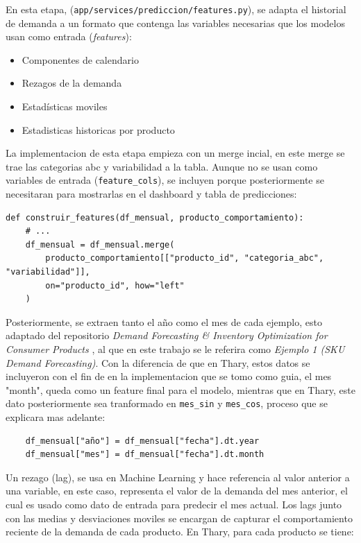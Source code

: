 En esta etapa, (\texttt{app/services/prediccion/features.py}), se adapta el historial de demanda a un formato que contenga las variables necesarias que los modelos usan como entrada (\textit{features}):

\begin{itemize}
    \item Componentes de calendario
    \item Rezagos de la demanda
    \item Estadísticas moviles
    \item Estadisticas historicas por producto
\end{itemize}

La implementacion de esta etapa empieza con un merge incial, en este merge se trae las categorias abc y variabilidad a la tabla. Aunque no se usan como variables de entrada (\texttt{feature\_cols}), se incluyen porque posteriormente se necesitaran para mostrarlas en el dashboard y tabla de predicciones:

\begin{verbatim}
def construir_features(df_mensual, producto_comportamiento):
    # ...
    df_mensual = df_mensual.merge(
        producto_comportamiento[["producto_id", "categoria_abc", "variabilidad"]],
        on="producto_id", how="left"
    )

\end{verbatim}

Posteriormente, se extraen tanto el año como el mes de cada ejemplo, esto adaptado del repositorio \textit{Demand Forecasting \& Inventory Optimization for Consumer Products} \cite{ejemplo1_demandforecast}, al que en este trabajo se le referira como \textit{Ejemplo 1 (SKU Demand Forecasting)}. Con la diferencia de que en Thary, estos datos se incluyeron con el fin de en la implementacion que se tomo como guia, el mes "month", queda como un feature final para el modelo, mientras que en Thary, este dato posteriormente sea tranformado en \texttt{mes\_sin} y \texttt{mes\_cos}, proceso que se explicara mas adelante:

\begin{verbatim}
    df_mensual["año"] = df_mensual["fecha"].dt.year
    df_mensual["mes"] = df_mensual["fecha"].dt.month
\end{verbatim}

Un rezago (lag), se usa en Machine Learning y hace referencia al valor anterior a una variable, en este caso, representa el valor de la demanda del mes anterior, el cual es usado como dato de entrada para predecir el mes actual. Los lags junto con las medias y desviaciones moviles se encargan de capturar el comportamiento reciente de la demanda de cada producto. En Thary, para cada producto se tiene:


